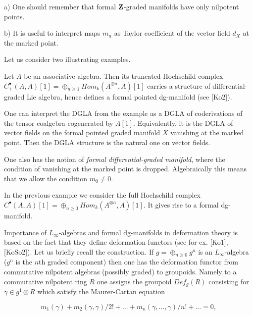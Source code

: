 \documentclass[a4paper,12pt]{article}
\begin{document}
\begin{rmk} a) One should remember that formal ${\bf Z}$-graded manifolds have only nilpotent
points.

b) It is useful to interpret maps $m_n$ as Taylor coefficient of the vector field $d_X$
at the marked point.



\end{rmk}

Let us consider two illustrating examples.

\begin{exa} Let $A$ be an associative algebra. Then its 
truncated Hochschild  complex 
$C_{+}^{\bullet}(A,A)[1]=\oplus_{n\ge 1}Hom_k(A^{\otimes n},A)[1]$
carries a structure of differential-graded Lie algebra, hence
defines a formal pointed dg-manifold (see [Ko2]). 


\end{exa}

One can interpret the DGLA from the example as a DGLA of coderivations
of the tensor coalgebra cogenerated by $A[1]$. Equivalently, it is
the DGLA of  vector fields  on the formal pointed graded manifold $X$
vanishing at the marked point.
Then the DGLA structure is the natural one on vector fields.



One also has the notion of {\it formal differential-graded manifold},
where the condition of vanishing at the marked point is dropped.
Algebraically this means that we allow the condition $m_0\ne 0$.

\begin{exa} In the previous example we consider the full
Hochschild complex $C^{\bullet}(A,A)[1]=\oplus_{n\ge 0}Hom_k(A^{\otimes n},A)[1]$. It gives rise
to a formal dg-manifold.

\end{exa}

Importance of
$L_{\infty}$-algebras and formal dg-manifolds 
in deformation theory is based on the fact
that they define  deformation functors (see for ex. [Ko1], [KoSo2]).
Let us briefly recall the construction.
If $g=\oplus_{n\ge 0}g^n$ is an $L_{\infty}$-algebra ($g^n$ is
the $n$th graded component) then
one has the deformation functor from commutative nilpotent algebras (possibly graded)  to groupoids.
Namely to a commutative nilpotent ring $R$ one assigns the groupoid
$Def_g(R)$ consisting for $\gamma \in g^1\otimes R$ which satisfy the
Maurer-Cartan equation

$$m_1(\gamma)+m_2(\gamma,\gamma)/2!+...+m_n(\gamma,...,\gamma)/n!+...=0,$$
\end{document}
